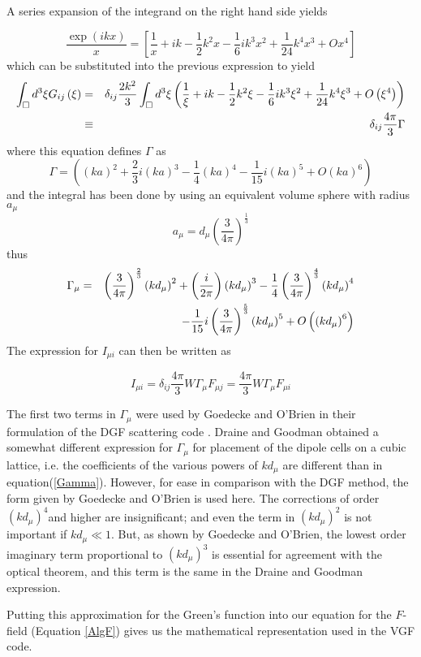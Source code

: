 \documentclass{article}
\begin{document}
A series expansion of the integrand on the right hand side yields

\begin{equation}
\frac{\exp (ikx)}{x}=\left[ \frac{1}{x}+ik-\frac{1}{2}k^{2}x-\frac{1}{6}%
ik^{3}x^{2}+\frac{1}{24}k^{4}x^{3}+Ox^{4}\right]
\end{equation}%
which can be substituted into the previous expression to yield 
\begin{eqnarray}
\int_{\Box }d^{3}\xi G_{ij}\left( \mathbf{\xi }\right) &=&\delta _{ij}\frac{%
2k^{2}}{3}\int_{\Box }d^{3}\xi \left( \frac{1}{\xi }+ik-\frac{1}{2}k^{2}\xi -%
\frac{1}{6}ik^{3}\xi ^{2}+\frac{1}{24}k^{4}\xi ^{3}+O\left( \xi ^{4}\right)
\right)  \notag \\
&\equiv &\delta _{ij}\frac{4\pi }{3}\Gamma
\end{eqnarray}%
where this equation defines $\Gamma $ as 
\begin{equation}
\Gamma =\left( \left( ka\right) ^{2}+\allowbreak \frac{2}{3}\allowbreak
i\left( ka\right) ^{3}-\frac{1}{4}\left( ka\right) ^{4}-\frac{1}{15}i\left(
ka\right) ^{5}+O\left( ka\right) ^{6}\right)
\end{equation}%
and the integral has been done by using an equivalent volume sphere with
radius $a_{\mu }$ 
\begin{equation}
a_{\mu }=d_{\mu }\left( \frac{3}{4\pi }\right) ^{\frac{1}{3}}
\end{equation}%
thus 
\begin{eqnarray}
\Gamma _{\mu } &=&\left( \frac{3}{4\pi }\right) ^{\frac{2}{3}}\left( kd_{\mu
}\right) ^{2}+\allowbreak \allowbreak \left( \frac{\allowbreak \allowbreak i%
}{2\pi }\right) \left( kd_{\mu }\right) ^{3}-\frac{1}{4}\left( \frac{3}{4\pi 
}\right) ^{\frac{4}{3}}\left( kd_{\mu }\right) ^{4}  \label{Gamma1} \\
&&-\frac{1}{15}i\left( \frac{3}{4\pi }\right) ^{\frac{5}{3}}\left( kd_{\mu
}\right) ^{5}+O\left( \left( kd_{\mu }\right) ^{6}\right)  \notag
\end{eqnarray}%
The expression for $I_{\mu i}$ can then be written as

\begin{equation}
I_{\mu i}=\delta _{ij}\frac{4\pi }{3}W\Gamma _{\mu }F_{\mu j}=\frac{4\pi }{3}%
W\Gamma _{\mu }F_{\mu i}  \label{ST1}
\end{equation}

The first two terms in $\Gamma _{\mu }$ were used by Goedecke and O'Brien in
their formulation of the DGF scattering code \cite{Goedecke88}. Draine and
Goodman obtained a somewhat different expression for $\Gamma _{\mu }$ for
placement of the dipole cells on a cubic lattice\cite{Draine93}, i.e. the
coefficients of the various powers of $kd_{\mu }$ are different than in
equation(\ref{Gamma}). However, for ease in comparison with the DGF method,
the form given by Goedecke and O'Brien is used here. The corrections of
order $\left( kd_{\mu }\right) ^{4}$and higher are insignificant; and even
the term in $\left( kd_{\mu }\right) ^{2}$ is not important if $kd_{\mu }\ll
1.$ But, as shown by Goedecke and O'Brien, the lowest order imaginary term
proportional to $\left( kd_{\mu }\right) ^{3}$ is essential for agreement
with the optical theorem, and this term is the same in the Draine and
Goodman expression.

Putting this approximation for the Green's function into our equation for
the $F$-field (Equation \ref{AlgF}) gives us the mathematical representation
used in the VGF code.



\end{document}
